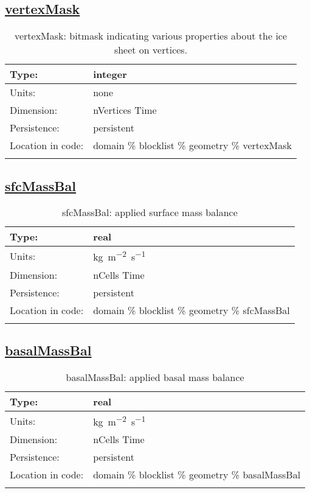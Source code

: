 \subsection[vertexMask]{\hyperref[sec:var_tab_geometry]{vertexMask}}
\label{subsec:var_sec_geometry_vertexMask}
\begin{center}
\begin{longtable}{| p{2.0in} | p{4.0in} |}
        \hline 
        Type: & integer \\
        \hline 
        Units: & \si{none} \\
        \hline 
        Dimension: & nVertices Time \\
        \hline 
        Persistence: & persistent \\
        \hline 
         Location in code: & domain \% blocklist \% geometry \% vertexMask \\
         \hline 
    \caption{vertexMask: bitmask indicating various properties about the ice sheet on vertices.}
\end{longtable}
\end{center}
\subsection[sfcMassBal]{\hyperref[sec:var_tab_geometry]{sfcMassBal}}
\label{subsec:var_sec_geometry_sfcMassBal}
\begin{center}
\begin{longtable}{| p{2.0in} | p{4.0in} |}
        \hline 
        Type: & real \\
        \hline 
        Units: & \si{kg.m^{-2}.s^{-1}} \\
        \hline 
        Dimension: & nCells Time \\
        \hline 
        Persistence: & persistent \\
        \hline 
         Location in code: & domain \% blocklist \% geometry \% sfcMassBal \\
         \hline 
    \caption{sfcMassBal: applied surface mass balance}
\end{longtable}
\end{center}
\subsection[basalMassBal]{\hyperref[sec:var_tab_geometry]{basalMassBal}}
\label{subsec:var_sec_geometry_basalMassBal}
\begin{center}
\begin{longtable}{| p{2.0in} | p{4.0in} |}
        \hline 
        Type: & real \\
        \hline 
        Units: & \si{kg.m^{-2}.s^{-1}} \\
        \hline 
        Dimension: & nCells Time \\
        \hline 
        Persistence: & persistent \\
        \hline 
         Location in code: & domain \% blocklist \% geometry \% basalMassBal \\
         \hline 
    \caption{basalMassBal: applied basal mass balance}
\end{longtable}
\end{center}
